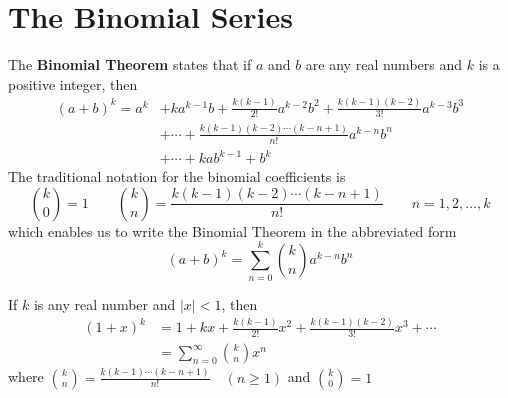 \section{The Binomial Series}
  The \textbf{Binomial Theorem} states that if $a$ and $b$ are any real numbers and $k$ is a positive integer, then
  \begin{equation*}
    \begin{split}
      (a+b)^k = a^k &+ ka^{k-1}b + \frac{k(k-1)}{2!}a^{k-2}b^2 + \frac{k(k-1)(k-2)}{3!}a^{k-3}b^3 \\
      &+ \cdots + \frac{k(k-1)(k-2) \cdots (k-n+1)}{n!}a^{k-n}b^n \\
      &+ \cdots + kab^{k-1}+b^k
    \end{split}
  \end{equation*}
  The traditional notation for the binomial coefficients is
  $$ \binom{k}{0} = 1 \qquad \binom{k}{n} = \frac{k(k-1)(k-2) \cdots (k-n+1)}{n!} \qquad n=1,2,\ldots,k $$
  which enables us to write the Binomial Theorem in the abbreviated form
  $$ (a+b)^k = \sum_{n=0}^{k} \binom{k}{n} a^{k-n}b^n $$
  \begin{definition}
    If $k$ is any real number and $|x|<1$, then
    \begin{align*}
      (1+x)^k &= 1 + kx + \frac{k(k-1)}{2!}x^2 + \frac{k(k-1)(k-2)}{3!}x^3 + \cdots \\
      &= \sum_{n=0}^{\infty} \binom{k}{n} x^n
    \end{align*}
    where $\displaystyle\binom{k}{n} = \frac{k(k-1) \cdots (k-n+1)}{n!} \quad (n \geq 1)$ and $\displaystyle\binom{k}{0} = 1$
  \end{definition}
